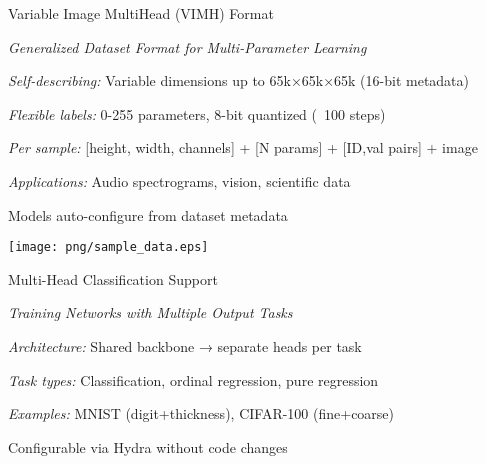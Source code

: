 \begin{slide}[\slideopts,toc={VIMH}]{Variable Image MultiHead (VIMH) Format}
  
  \emph{Generalized Dataset Format for Multi-Parameter Learning}
  
  \begin{itemize}
    \mpitem \emph{Self-describing:} Variable dimensions up to 65k×65k×65k (16-bit metadata)
    
    \mpitem \emph{Flexible labels:} 0-255 parameters, 8-bit quantized (~100 steps)
    
    \mpitem \emph{Per sample:} [height, width, channels] + [N params] + [ID,val pairs] + image
    
    \mpitem \emph{Applications:} Audio spectrograms, vision, scientific data
    
    \mpitem Models auto-configure from dataset metadata
  \end{itemize}
  \centerline{\texttt{[image: png/sample\_data.eps]}}
\end{slide}
  


\begin{slide}[\slideopts,toc={MultiHead}]{Multi-Head Classification Support}
  
  \emph{Training Networks with Multiple Output Tasks}
  
  \begin{itemize}
    \mpitem \emph{Architecture:} Shared backbone → separate heads per task
    
    \mpitem \emph{Task types:} Classification, ordinal regression, pure regression
    
    \mpitem \emph{Examples:} MNIST (digit+thickness), CIFAR-100 (fine+coarse)
    
    \mpitem Configurable via Hydra without code changes
  \end{itemize}
  
  \scalebox{0.7}{
    
  }
\end{slide}

